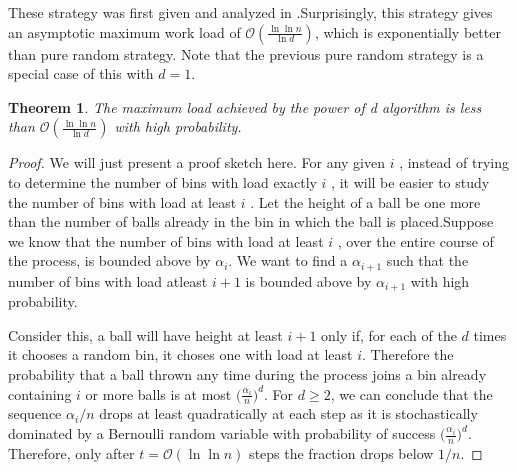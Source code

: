 \documentclass[a4paper,english,11pt]{article}
\newtheorem{theorem}{Theorem}
\begin{document}
These strategy was first given and analyzed in \cite{Azar}.Surprisingly, this strategy gives an asymptotic maximum work load of $\mathcal{O}(\frac{\ln \ln n}{\ln d})$, which is exponentially better than pure random strategy. Note that the previous pure random strategy is a special case of this with $d=1$.
\begin{theorem}
The maximum load achieved by the power of d algorithm is less than $\mathcal{O}(\frac{\ln \ln n}{\ln d})$ with high probability.
\end{theorem}
\begin{proof}
We will just present a proof sketch here. For any given $ i $ , instead of trying to determine the number of bins with
load exactly $ i $ , it will be easier to study the number of bins with load at least $ i $ . Let the height of a ball be one more than the number of balls already in the bin in which the ball is placed.Suppose we know that the number of bins with load at least $ i $ , over the entire course of the process, is bounded above by $\alpha_i$. We want to find a $\alpha_{i+1}$ such that the number of bins with load atleast $i+1$ is bounded above by $\alpha_{i+1}$ with high probability.
\par Consider this, a ball will have height at least $ i + 1 $ only if, for each of the $ d $ times it chooses a random bin, it choses one with load at least $ i $. Therefore the probability that a ball thrown any time during the process joins a bin already containing $ i $ or more balls is at most $\Big(\frac{\alpha_i}{n}\Big)^d$. For $d \geq 2$, we can conclude that the sequence $\alpha_i/n$ drops at least quadratically at each step as it is stochastically dominated by a Bernoulli random variable with probability of success $\Big(\frac{\alpha_i}{n}\Big)^d$. Therefore, only after $t = \mathcal{O}(\ln \ln n)$ steps the fraction drops below $1/n$. 
\end{proof}
\end{document}
